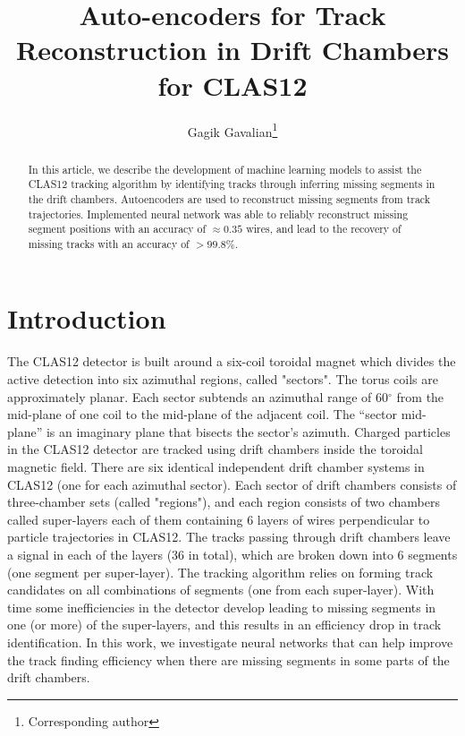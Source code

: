 \documentclass[12pt]{article}
\title{Auto-encoders for Track Reconstruction in Drift Chambers for CLAS12}
\author[1]{Gagik Gavalian\thanks{Corresponding author}}
\affil[1]{Thomas Jefferson National Accelerator Facility, Newport News, VA 23606}
\date{}
\begin{document}
\begin{titlepage}
\maketitle
\begin{abstract}
In this article, we describe the development of machine learning models to assist the CLAS12 tracking algorithm
by identifying tracks through inferring missing segments in the drift chambers.  Autoencoders are used to reconstruct 
missing segments from track trajectories. Implemented neural network was able to reliably reconstruct missing 
segment positions with an accuracy of $\approx 0.35$ wires, and lead to the recovery of missing tracks with an accuracy of $>99.8\%$. 
\end{abstract}
\end{titlepage}

\section{Introduction}

\indent

The CLAS12\cite{Burkert:2020akg} detector is built around a six-coil toroidal magnet which divides the active detection into six azimuthal regions, called "sectors". The torus coils are approximately planar. Each sector subtends an azimuthal range of 60$^\circ$ from the mid-plane of one coil to the mid-plane of the adjacent coil. The “sector mid-plane” is an imaginary plane that bisects the sector’s azimuth. 
Charged particles in the CLAS12 detector are tracked using drift chambers\cite{Mestayer:2020saf} inside the toroidal magnetic field. There are six identical independent drift chamber systems in CLAS12 (one for each azimuthal sector). Each sector of drift chambers consists of three-chamber sets (called "regions"), and each region consists of two chambers called super-layers each of them containing 6 layers of wires perpendicular to particle trajectories in CLAS12. The tracks passing through drift chambers leave a signal in each of the layers (36 in total), which are broken down into 6 segments (one segment per super-layer). The tracking algorithm relies on forming track candidates on all combinations of segments (one from each super-layer).
With time some inefficiencies in the detector develop leading to missing segments in one (or more) of the super-layers, and this results in an efficiency drop in track identification. In this work, we investigate neural networks that can help improve the track finding efficiency when there are missing segments in some parts of the drift chambers.
\end{document}
